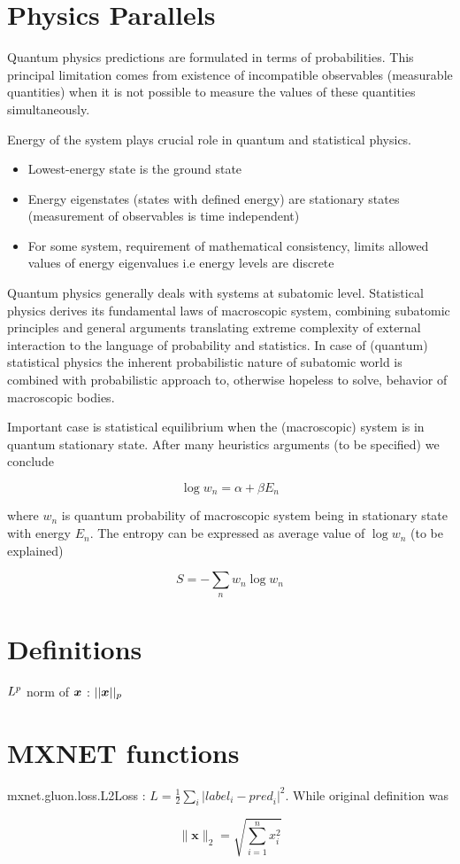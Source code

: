 \documentclass[12pt]{article}
\begin{document}
\newlength{\notationgap}
\setlength{\notationgap}{1pc}

\section{Physics Parallels}

Quantum physics predictions are formulated in terms of
probabilities. This principal limitation comes from existence of incompatible observables
(measurable quantities) when it is not possible to measure the values of these quantities simultaneously.

Energy of the system plays crucial role in quantum and statistical physics.
\begin{itemize}
  \item Lowest-energy state is the ground state
  \item Energy eigenstates (states with defined energy) are stationary states (measurement of observables is time independent)
  \item For some system, requirement of mathematical consistency, limits allowed values of energy eigenvalues i.e energy levels are discrete
\end{itemize}

Quantum physics generally deals with systems at subatomic level. Statistical physics derives its fundamental laws of macroscopic system, combining subatomic principles and general arguments translating extreme complexity of external interaction to the language of probability and statistics. In case of (quantum) statistical physics the inherent probabilistic nature of subatomic world is combined with probabilistic approach to, otherwise hopeless to solve, behavior of macroscopic bodies. 

Important case is statistical equilibrium when the (macroscopic) system is in quantum stationary state. After many heuristics arguments (to be specified) we conclude

\[ \log w_n = \alpha + \beta E_n \] 

where $w_n$ is quantum probability of macroscopic system being in stationary state with energy $E_n$. The entropy can be expressed as average value of $\log w_n$ (to be explained)

\[ S = -\sum_n w_n \log w_n \]

\section{Definitions}

$L^p$ norm of ${\bm{x}}$ : $\displaystyle || {\bm{x}} ||_p$ 

\section{MXNET functions}

mxnet.gluon.loss.L2Loss : $L = \frac{1}{2} \sum_i \vert {label}_i - {pred}_i \vert^2$. While original definition was

\[\|\mathbf{x}\|_2 = \sqrt{\sum_{i=1}^n x_i^2}\]


\end{document}
